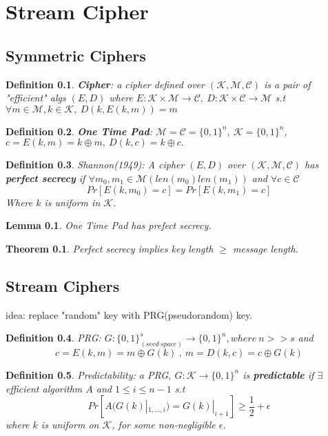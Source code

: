 \documentclass[12pt]{book}
\newtheorem{mydef}{Definition}
\newtheorem{mylemma}{Lemma}
\newtheorem{mythm}{Theorem}
\newcommand{\mk}{\mathcal{K}}
\newcommand{\mc}{\mathcal{C}}
\newcommand{\mm}{\mathcal{M}}
\newcommand{\bs}[1]{\{0, 1\}^#1}
\begin{document}
\chapter*{Stream Cipher}
\section{Symmetric Ciphers}
\begin{mydef}
	\textbf{Cipher}: a cipher defined over $(\mk, \mm, \mc)$ is a pair of "efficient" algs $(E,D)$ where $E: \mk \times \mm \rightarrow \mc,\ D:\mk\times\mc \rightarrow \mm $ s.t $\forall m \in \mm, k \in \mk,\ D(k, E(k, m)) = m$
\end{mydef}

\begin{mydef}
	\textbf{One Time Pad}: $\mm = \mc = \bs{n},\ \mk = \bs{n}$,  $c=E(k, m) = k\oplus m,\ D(k, c) = k \oplus c.$
\end{mydef}

\begin{mydef}
	Shannon(1949): A cipher $(E, D)$ over $(\mk, \mm, \mc)$ has \textbf{perfect secrecy} if $\forall m_0, m_1\in \mm (len(m_0) len(m_1))$ and $\forall c \in \mc$ 
	$$ Pr[E(k, m_0) = c] = Pr[E(k, m_1) = c]$$
Where $k$ is uniform in $\mk$.
\end{mydef}

\begin{mylemma}
	One Time Pad has prefect secrecy.
\end{mylemma}

\begin{mythm}
	Perfect secrecy implies key length $\geq$ message length.
\end{mythm}

\section{Stream Ciphers}
idea: replace "random" key with PRG(pseudorandom) key.

\begin{mydef}
	PRG: $G:\bs{s}_{(seed\ space)} \rightarrow \bs{n}, where\ n >> s$ and 
	$$ c= E(k, m) = m \oplus G(k) \ , \ m= D(k, c) = c \oplus G(k) $$
\end{mydef}

\begin{mydef}
 Predictability: a PRG,  $G:\mk \rightarrow \bs{n}$ is \textbf{predictable} if $\exists$ efficient algorithm $A$ and $1\leq i \leq n -1$ s.t 
 $$Pr\left[A(G(k)|_{1,...,i}) = G(k)|_{i+1} \right] \geq \frac{1}{2} + \epsilon $$
 where $k$ is uniform on $\mk$,  for some non-negligible $\epsilon$.
\end{mydef}
\end{document}
